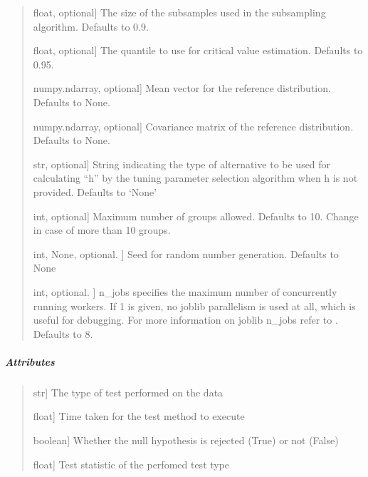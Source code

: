 \documentclass[letterpaper,10pt,english,openany,oneside]{sphinxmanual}
\begin{document}
\begin{fulllineitems}
\begin{quote}
\begin{description}
\sphinxlineitem{b}{[}float, optional{]}
\sphinxAtStartPar
The size of the subsamples used in the subsampling algorithm. Defaults to 0.9.

\sphinxlineitem{quantile}{[}float, optional{]}
\sphinxAtStartPar
The quantile to use for critical value estimation. Defaults to 0.95.

\sphinxlineitem{mu\_hat}{[}numpy.ndarray, optional{]}
\sphinxAtStartPar
Mean vector for the reference distribution. Defaults to None.

\sphinxlineitem{sigma\_hat}{[}numpy.ndarray, optional{]}
\sphinxAtStartPar
Covariance matrix of the reference distribution. Defaults to None.

\sphinxlineitem{alternative}{[}str, optional{]}
\sphinxAtStartPar
String indicating the type of alternative to be used for calculating “h” 
by the tuning parameter selection algorithm when h is not provided.
Defaults to ‘None’

\sphinxlineitem{k\_threshold}{[}int, optional{]}
\sphinxAtStartPar
Maximum number of groups allowed. Defaults to 10. Change in case of more than 10 groups.

\sphinxlineitem{random\_state}{[}int, None, optional. {]}
\sphinxAtStartPar
Seed for random number generation. Defaults to None

\sphinxlineitem{n\_jobs}{[}int, optional. {]}
\sphinxAtStartPar
n\_jobs specifies the maximum number of concurrently 
running workers. If 1 is given, no joblib parallelism 
is used at all, which is useful for debugging. For more 
information on joblib n\_jobs refer to \sphinxhyphen{} 
.
Defaults to 8.

\end{description}
\end{quote}


\subparagraph{Attributes}
\label{\detokenize{api_reference/generated/QuadratiK.kernel_test.KernelTest:attributes}}\begin{quote}
\begin{description}
\sphinxlineitem{test\_type\_}{[}str{]}
\sphinxAtStartPar
The type of test performed on the data

\sphinxlineitem{execution\_time}{[}float{]}
\sphinxAtStartPar
Time taken for the test method to execute

\sphinxlineitem{h0\_rejected\_}{[}boolean{]}
\sphinxAtStartPar
Whether the null hypothesis is rejected (True) or not (False)

\sphinxlineitem{test\_statistic\_}{[}float{]}
\sphinxAtStartPar
Test statistic of the perfomed test type


\end{description}
\end{quote}
\end{fulllineitems}
\end{document}
